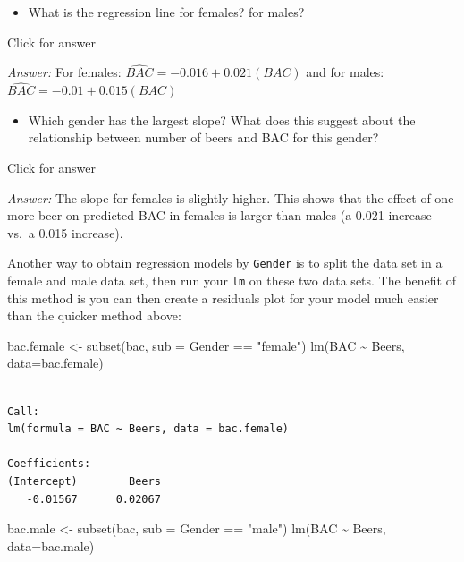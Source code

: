 \documentclass[
]{book}
\newenvironment{Shaded}{\begin{snugshade}}{\end{snugshade}}
\newcommand{\AttributeTok}[1]{\textcolor[rgb]{0.77,0.63,0.00}{#1}}
\newcommand{\FunctionTok}[1]{\textcolor[rgb]{0.00,0.00,0.00}{#1}}
\newcommand{\NormalTok}[1]{#1}
\newcommand{\OtherTok}[1]{\textcolor[rgb]{0.56,0.35,0.01}{#1}}
\newcommand{\SpecialCharTok}[1]{\textcolor[rgb]{0.00,0.00,0.00}{#1}}
\newcommand{\StringTok}[1]{\textcolor[rgb]{0.31,0.60,0.02}{#1}}
\providecommand{\tightlist}{%
  \setlength{\itemsep}{0pt}\setlength{\parskip}{0pt}}
\begin{document}
\begin{itemize}
\tightlist
\item
  What is the regression line for females? for males?
\end{itemize}

Click for answer

\emph{Answer:} For females: \(\widehat{BAC} = -0.016 +0.021(BAC)\) and for males: \(\widehat{BAC} = -0.01 +0.015(BAC)\)

\begin{itemize}
\tightlist
\item
  Which gender has the largest slope? What does this suggest about the relationship between number of beers and BAC for this gender?
\end{itemize}

Click for answer

\emph{Answer:} The slope for females is slightly higher. This shows that the effect of one more beer on predicted BAC in females is larger than males (a 0.021 increase vs.~a 0.015 increase).

Another way to obtain regression models by \texttt{Gender} is to split the data set in a female and male data set, then run your \texttt{lm} on these two data sets. The benefit of this method is you can then create a residuals plot for your model much easier than the quicker method above:

\begin{Shaded}
\begin{Highlighting}[]
\NormalTok{bac.female }\OtherTok{\textless{}{-}} \FunctionTok{subset}\NormalTok{(bac, }\AttributeTok{sub =}\NormalTok{ Gender }\SpecialCharTok{==} \StringTok{"female"}\NormalTok{)}
\FunctionTok{lm}\NormalTok{(BAC }\SpecialCharTok{\textasciitilde{}}\NormalTok{ Beers, }\AttributeTok{data=}\NormalTok{bac.female)}
\end{Highlighting}
\end{Shaded}

\begin{verbatim}

Call:
lm(formula = BAC ~ Beers, data = bac.female)

Coefficients:
(Intercept)        Beers  
   -0.01567      0.02067  
\end{verbatim}

\begin{Shaded}
\begin{Highlighting}[]
\NormalTok{bac.male }\OtherTok{\textless{}{-}} \FunctionTok{subset}\NormalTok{(bac, }\AttributeTok{sub =}\NormalTok{ Gender }\SpecialCharTok{==} \StringTok{"male"}\NormalTok{)}
\FunctionTok{lm}\NormalTok{(BAC }\SpecialCharTok{\textasciitilde{}}\NormalTok{ Beers, }\AttributeTok{data=}\NormalTok{bac.male)}
\end{Highlighting}
\end{Shaded}
\end{document}
